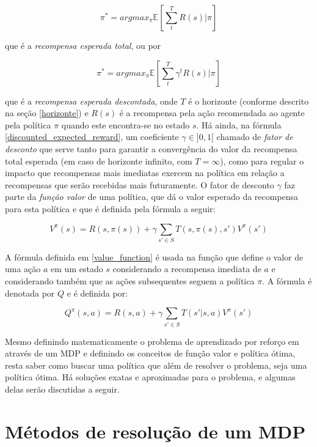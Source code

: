 \documentclass[cic,tc]{iiufrgs}
\begin{document}
\begin{equation}
  \pi^* = argmax_\pi\mathbb{E}[\sum_t^TR(s) | \pi]
\end{equation}

 que é a \textit{recompensa esperada total}, ou por

\begin{equation} \label{discounted_expected_reward}
  \pi^* = argmax_\pi\mathbb{E}[\sum_t^T\gamma^tR(s) | \pi]
\end{equation}

que é a \textit{recompensa esperada descontada}, onde $T$ é o horizonte
(conforme descrito na seção \ref{horizonte}) e $R(s)$ é a recompensa pela ação
recomendada ao agente pela política $\pi$ quando este encontra-se no estado
$s$. Há ainda, na fórmula \ref{discounted_expected_reward}, um coeficiente
$\gamma \in ]0,1[$ chamado de \textit{fator de desconto} que serve tanto para
garantir a convergência do valor da recompensa total esperada (em caso de horizonte
infinito, com $T = \infty$), como para regular o impacto que recompensas mais
imediatas exercem na política em relação a recompensas que serão recebidas mais
futuramente.
O fator de desconto $\gamma$ faz parte da \textit{função valor} de uma política,
que dá o valor esperado da recompensa para esta política e que é definida pela
fórmula a seguir:

\begin{equation} \label{value_function}
  V^\pi(s) =  R(s,\pi(s)) + \gamma\sum_{s' \in S}T(s,\pi(s), s')V^\pi(s')
\end{equation}

A fórmula definida em \ref{value_function} é usada na função que define o valor
de uma ação $a$ em um estado $s$ considerando a recompensa imediata de $a$ e
considerando também que as ações subsequentes seguem a política $\pi$. A fórmula
é denotada por $Q$ e é definida por:

\begin{equation}\label{action_value}
  Q^\pi(s,a) = R(s,a) + \gamma\sum_{s' \in S}T(s'|s,a)V^\pi(s')
\end{equation}


Mesmo definindo matematicamente o problema de aprendizado por reforço em
através de um MDP e definindo os conceitos de função valor e  política ótima,
resta saber como buscar uma política que além de resolver o problema, seja uma
política ótima.
Há soluções exatas e aproximadas para o problema, e algumas delas serão
discutidas a seguir.


\section{Métodos de resolução de um MDP}
\end{document}
